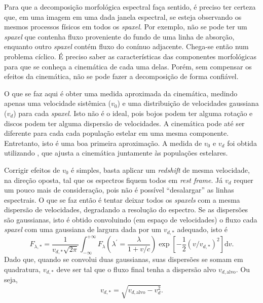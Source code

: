 Para que a decomposição morfológica espectral faça sentido, é preciso ter
certeza que, em uma imagem em uma dada janela espectral, se esteja observando os
mesmos processos físicos em todos os {\em spaxel}. Por exemplo, não se pode ter
um {\em spaxel} que contenha fluxo proveniente do fundo de uma linha de
absorção, enquanto outro {\em spaxel} contém fluxo do conínuo adjacente.
Chega-se então num problema cíclico. É preciso saber as características das
componentes morfológicas para que se conheça a cinemática de cada uma delas.
Porém, sem compensar os efeitos da cinemática, não se pode fazer a decomposição
de forma confiável.

O que se faz aqui é obter uma medida aproximada da cinemática, medindo apenas
uma velocidade sistêmica ($v_0$) e uma distribuição de velocidades gaussiana
($v_d$) para cada {\em spaxel}. Isto não é o ideal, pois bojos podem ter alguma
rotação e discos podem ter alguma dispersão de velocidades. A cinemática pode
até ser diferente para cada cada população estelar em uma mesma componente.
Entretanto, isto é uma boa primeira aproximação. A medida de $v_0$ e $v_d$ foi
obtida utilizando \starlight, que ajusta a cinemática juntamente às populações
estelares.

Corrigir efeitos de $v_0$ é simples, basta aplicar um {\em redshift} de mesma
velocidade, na direção oposta, tal que os espectros fiquem todos em {\em rest
frame}. Já $v_d$ requer um pouco mais de consideração, pois não é possível
``desalargar'' as linhas espectrais. O que se faz então é tentar deixar todos os
{\em spaxels} com a mesma dispersão de velocidades, degradando a resolução do
espectro. Se as dispersões são gaussianas, isto é obtido convoluindo (em espaço
de velocidades) o fluxo cada {\em spaxel} com uma gaussiana de largura dada por
um $v_{d,\ast}$ adequado, isto é
\begin{equation*}
F_{\lambda,\ast} = \frac{1}{v_{d,\ast}\sqrt{2\pi}}\int_{-\infty}^{+\infty}
F_\lambda \left(\lambda^\prime = \frac{\lambda}{1 + v/c}\right) \exp \left[ -\frac{1}{2}
(v/v_{d,\ast})^2 \right] \mathrm{d}v.
\end{equation*}
Dado que, quando se convolui duas gaussianas, suas dispersões se somam em
quadratura, $v_{d,\ast}$ deve ser tal que o fluxo final tenha a dispersão
alvo $v_{d,\mathrm{alvo}}$. Ou seja,
\begin{equation*}
v_{d,\ast} = \sqrt{v_{d,\mathrm{alvo}} - v^2_d}.
\end{equation*}

